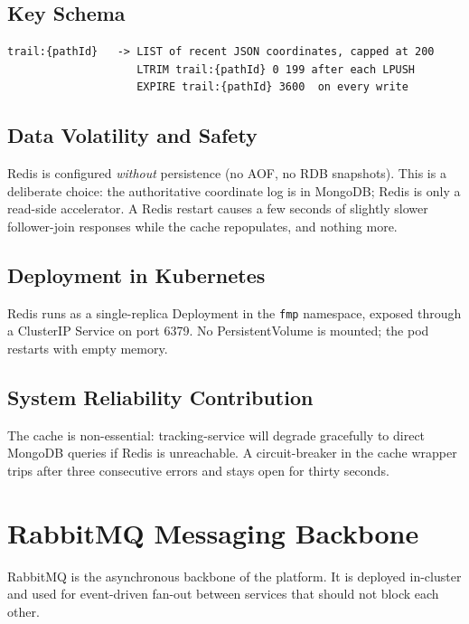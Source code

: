 \documentclass[11pt,a4paper]{article}
\begin{document}
\subsection{Key Schema}
\begin{lstlisting}
trail:{pathId}   -> LIST of recent JSON coordinates, capped at 200
                    LTRIM trail:{pathId} 0 199 after each LPUSH
                    EXPIRE trail:{pathId} 3600  on every write
\end{lstlisting}

\subsection{Data Volatility and Safety}
Redis is configured \emph{without} persistence (no AOF, no RDB
snapshots).  This is a deliberate choice: the authoritative coordinate
log is in MongoDB; Redis is only a read-side accelerator.  A Redis
restart causes a few seconds of slightly slower follower-join
responses while the cache repopulates, and nothing more.

\subsection{Deployment in Kubernetes}
Redis runs as a single-replica Deployment in the \texttt{fmp}
namespace, exposed through a ClusterIP Service on port 6379.  No
PersistentVolume is mounted; the pod restarts with empty memory.

\subsection{System Reliability Contribution}
The cache is non-essential: tracking-service will degrade gracefully
to direct MongoDB queries if Redis is unreachable.  A circuit-breaker
in the cache wrapper trips after three consecutive errors and stays
open for thirty seconds.

\section{RabbitMQ Messaging Backbone}

RabbitMQ is the asynchronous backbone of the platform.  It is
deployed in-cluster and used for event-driven fan-out between
services that should not block each other.
\end{document}
